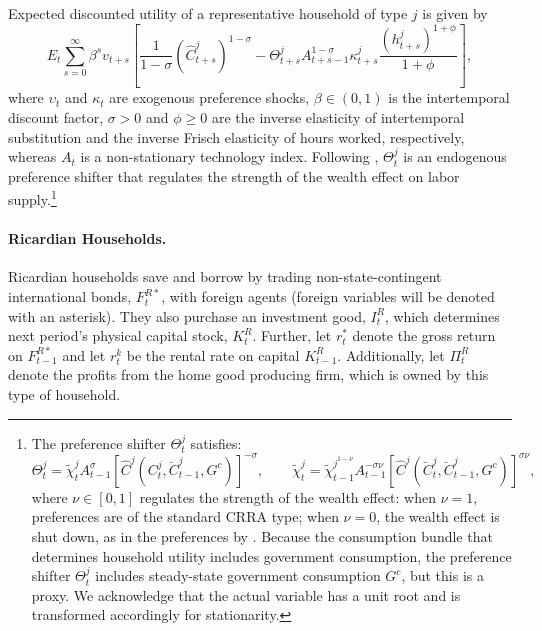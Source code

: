 \documentclass[12pt]{article}
\begin{document}
Expected discounted utility of a representative household of type $j$ is given by
\begin{equation}
E_{t}\sum_{s=0}^{\infty }\beta ^{s}v_{t+s}\left[ \frac{1}{1-\sigma }\left(\hat{C}^j_{t+s}\right) ^{1-\sigma }-\Theta^j_{t+s}A_{t+s-1}^{1-\sigma }\kappa _{t+s}^j\frac{\left(h^j_{t+s}\right)^{1+\phi }}{1+\phi }\right], 
\label{eq:Households_1}
\end{equation}%
where $\upsilon_t$ and $\kappa _{t}$ are exogenous preference shocks, $\beta \in (0,1)$ is the intertemporal discount factor, $\sigma >0$ and $\phi \geq 0$ are the inverse elasticity of intertemporal substitution and the inverse Frisch elasticity of hours worked, respectively, whereas $A_{t}$ is a non-stationary technology index. Following \citet{gali2012unemployment}, $\Theta^j_{t}$ is an endogenous preference shifter that regulates the strength of the wealth effect on labor supply.\footnote{The preference shifter $\Theta^j_{t}$ satisfies:
\begin{equation*}
\Theta^j_{t}= \widetilde{\chi }_{t}^j A_{t-1}^{\sigma }\left[\hat{C}^j(C_t^j,\breve{C}_{t-1}^j,G^c)\right]^{-\sigma },\qquad \widetilde{\chi }_{t}^j=\widetilde{\chi }%
_{t-1}^{j^{1-\nu }}A_{t-1}^{-\sigma \nu }\left[\hat{C}^j(\breve{C}_t^j,\breve{C}_{t-1}^j,G^c)\right] ^{\sigma \nu },
\end{equation*}
where $\nu \in \left[ 0,1 \right]$ regulates the strength of the wealth effect: when $\nu=1$, preferences are of the standard CRRA type; when $\nu=0$, the wealth effect is shut down, as in the preferences by \citet{greenwood1988investment}. Because the consumption bundle that determines household utility includes government consumption, the preference shifter $\Theta^j_t$ includes steady-state government consumption $G^c$, but this is a proxy. We acknowledge that the actual variable has a unit root and is transformed accordingly for stationarity.}

\paragraph{Ricardian Households.}

Ricardian households save and borrow by trading non-state-contingent international bonds, $F_{t}^{R\ast }$, with foreign agents (foreign variables will be denoted with an asterisk). They also purchase an investment good, $I^R_{t}$, which determines next period's physical capital stock, $K^R_{t}$. Further, let $r_{t}^{\ast }$ denote the gross return on $F_{t-1}^{R\ast }$ and let $r_t^k$ be the rental rate on capital $K_{t-1}^R$. Additionally, let $\Pi_t^R$ denote the profits from the home good producing firm, which is owned by this type of household.
\end{document}
